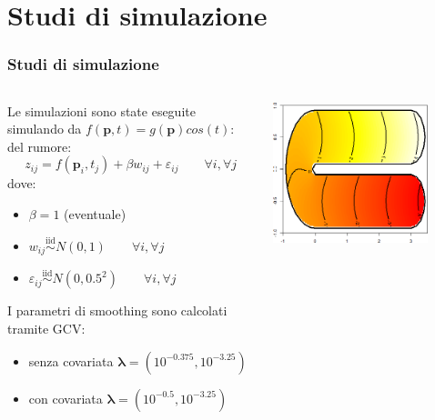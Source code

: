 \documentclass[landscape,9pt]{beamer}                           %
\begin{document}
\section{Studi di simulazione}
\begin{frame}
\frametitle{Studi di simulazione}
\begin{columns}
	\begin{column}{0.6\textwidth}
	Le simulazioni sono state eseguite simulando da $f(\bm{p},t)=g(\bm{p})cos(t)$:
	del rumore:
	$$
	z_{ij}=f(\bm p_{i},t_j) + \beta w_{ij} + \varepsilon_{ij} \qquad \forall i , \forall j 
	$$
	dove:
	\begin{itemize}
	\item $\beta=1$ (eventuale)
	\item $w_{ij}\stackrel{\mathrm{iid}}{\sim}N(0,1) \qquad \forall i, \forall j$
	\item $\varepsilon_{ij}\stackrel{\mathrm{iid}}{\sim}N(0,0.5^2) \qquad \forall i, \forall j$
	\end{itemize} 
	I parametri di smoothing sono calcolati tramite GCV:
	\begin{itemize}
	\item senza covariata $\bm{\lambda}= (10^{-0.375}, 10^{-3.25})$
	\item con covariata $\bm{\lambda}= (10^{-0.5}, 10^{-3.25})$
	\end{itemize}
	\end{column}
	\begin{column}{0.4\textwidth}
		\begin{center}
		\includegraphics[width=0.8\textwidth]{Immagini/DomC_fstest.png}
		\end{center}

\end{column}
\end{columns}
\end{frame}
\end{document}
